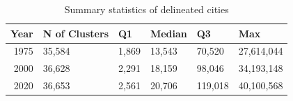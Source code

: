 \begin{table}[!h]
\centering
\caption{\label{tab:summary_stats}Summary statistics of delineated cities}
\centering
\begin{tabular}[t]{rlllll}
\toprule
Year & N of Clusters & Q1 & Median & Q3 & Max\\
\midrule
1975 & 35,584 & 1,869 & 13,543 & 70,520 & 27,614,044\\
2000 & 36,628 & 2,291 & 18,159 & 98,046 & 34,193,148\\
2020 & 36,653 & 2,561 & 20,706 & 119,018 & 40,100,568\\
\bottomrule
\end{tabular}
\end{table}
